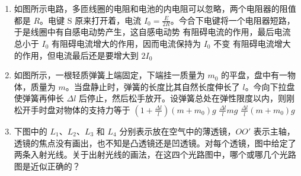 \documentclass[\gkver]{gaokaozhenti}
\begin{document}
\begin{enumerate}
\item
如图所示电路，多匝线圈的电阻和电池的内电阻可以忽略，两个电阻器的阻值都是 $R$。电键 S 原来打开着，电流 $I_{0}=\frac{E}{2R}$。今合下电键将一个电阻器短路，于是线圈中有自感电动势产生，这自感电动势
{有阻碍电流的作用，最后电流总小于 $I_{0}$}
{有阻碍电流增大的作用，因而电流保持为 $I_{0}$ 不变}
{有阻碍电流增大的作用，但电流最后还是要增大到 $2I_{0}$}


\item
如图所示，一根轻质弹簧上端固定，下端挂一质量为 $m_{0}$ 的平盘，盘中有一物体，质量为 $m$。当盘静止时，弹簧的长度比其自然长度伸长了 $l$。今向下拉盘使弹簧再伸长 $\Delta l$ 后停止，然后松手放开。设弹簧总处在弹性限度以内，则刚松开手时盘对物体的支持力等于
{$\left(1+\frac{\Delta l}{l}\right)(m+m_{0})g$}
{$\frac{\Delta l}{l}mg$}
{$\frac{\Delta l}{l}(m+m_{0})g$}


\item
下图中的 $L_{1}$、$L_{2}$、$L_{3}$ 和 $L_{4}$ 分别表示放在空气中的薄透镜，$OO'$ 表示主轴，透镜的焦点没有画出，也不知是凸透镜还是凹透镜。对每个透镜，图中给定了两条入射光线。关于出射光线的画法，在这四个光路图中，哪个或哪几个光路图是近似正确的？
\fourchoices[answer=BD, ispicture=true, wA=5.58cm, wB=5.53cm, hC=2.30cm, wD=5.56cm]
{}
{}
{}
{}


\end{enumerate}
\end{document}

